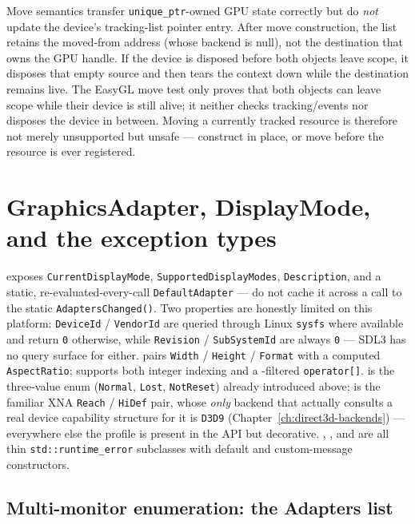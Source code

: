 Move semantics transfer \texttt{unique\_ptr}-owned GPU state correctly but do \emph{not} update
the device's tracking-list pointer entry. After move construction, the list retains the
moved-from address (whose backend is null), not the destination that owns the GPU handle. If the
device is disposed before both objects leave scope, it disposes that empty source and then tears
the context down while the destination remains live. The EasyGL move test only proves that both
objects can leave scope while their device is still alive; it neither checks tracking/events nor
disposes the device in between. Moving a currently tracked resource is therefore not merely
unsupported but unsafe --- construct in place, or move before the resource is ever registered.

\section{GraphicsAdapter, DisplayMode, and the exception types}
\label{sec:adapter-displaymode}

 exposes \texttt{CurrentDisplayMode}, \texttt{SupportedDisplayModes},
\texttt{Description}, and a static, re-evaluated-every-call \texttt{DefaultAdapter} --- do not
cache it across a call to the static \texttt{AdaptersChanged()}. Two properties are honestly
limited on this platform: \texttt{DeviceId} / \texttt{VendorId} are queried through Linux
\texttt{sysfs} where available and return \texttt{0} otherwise, while
\texttt{Revision} / \texttt{SubSystemId} are always \texttt{0} --- SDL3 has no query surface for
either.  pairs \texttt{Width} / \texttt{Height} / \texttt{Format} with a
computed \texttt{AspectRatio};  supports both integer indexing
and a -filtered \texttt{operator[]}.  is
the three-value enum (\texttt{Normal}, \texttt{Lost}, \texttt{NotReset}) already introduced
above;  is the familiar XNA \texttt{Reach} / \texttt{HiDef} pair, whose
\emph{only} backend that actually consults a real device capability structure for it is
\texttt{D3D9} (Chapter~\ref{ch:direct3d-backends}) --- everywhere else the profile is present in
the API but decorative. , , and
 are all thin \texttt{std::runtime\_error}
subclasses with default and custom-message constructors.

\subsection{Multi-monitor enumeration: the Adapters list}
\label{sec:adapters-list}

